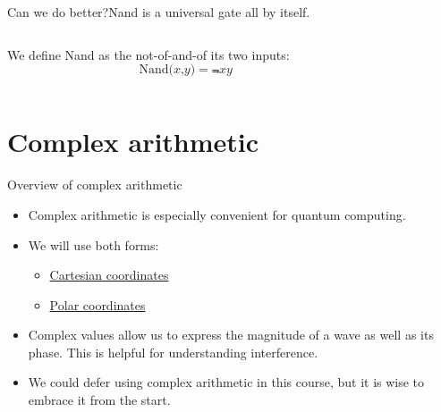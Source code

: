\begin{frame}{Can we do better?}{Nand is a universal gate all by itself.}
\begin{columns}
\begin{column}{0.6\textwidth}
We define Nand as the not-of-and-of its two inputs:
\[
\mbox{Nand($x$,$y$)} = \Not{xy}
\]
\end{column}
\begin{column}{0.4\textwidth}
\end{column}
\end{columns}
\end{frame}

\section{Complex arithmetic}

\begin{frame}{Overview of complex arithmetic}
\begin{itemize}
    \item Complex arithmetic is especially convenient for quantum computing.
    \item We will use both forms:
    \begin{itemize}
        \item \href{https://en.wikipedia.org/wiki/Cartesian_coordinate_system}{Cartesian coordinates}
        \item \href{https://en.wikipedia.org/wiki/Polar_coordinate_system}{Polar coordinates}
    \end{itemize}
    \item Complex values allow us to express the magnitude of a wave as well as its phase.  This is helpful for understanding interference.
    \item We could defer using complex arithmetic in this course, but it is wise to embrace it from the start.
\end{itemize}
\end{frame}

